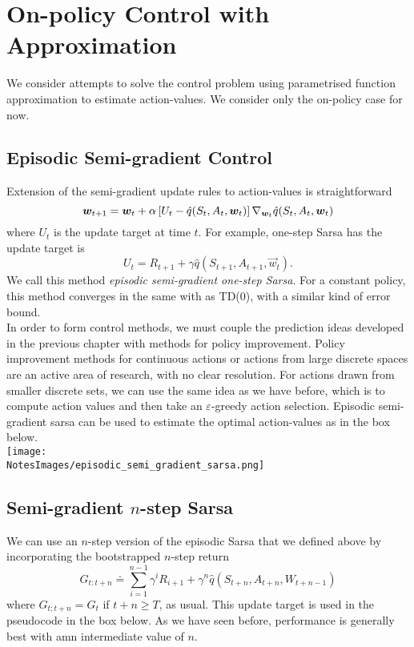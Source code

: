\section{On-policy Control with Approximation}
We consider attempts to solve the control problem using parametrised function approximation to estimate action-values. We consider only the on-policy case for now.

\subsection{Episodic Semi-gradient Control}
Extension of the semi-gradient update rules to action-values is straightforward
\begin{equation}
    \boldsymbol{w}_{t+1} = \boldsymbol{w}_t + \alpha \left[ U_t - \hat{q}(S_t, A_t, \boldsymbol{w}_t) \right] \nabla_{\boldsymbol{w}_t} \hat{q}(S_t, A_t, \boldsymbol{w}_t)
\end{equation}
where $U_t$ is the update target at time $t$. For example, one-step Sarsa has the update target is
\[
    U_t = R_{t+1} + \gamma \hat{q}(S_{t+1}, A_{t+1}, \vec{w}_t).
\]
We call this method \emph{episodic semi-gradient one-step Sarsa}. For a constant policy, this method converges in the same with as TD(0), with a similar kind of error bound.\\

In order to form control methods, we must couple the prediction ideas developed in the previous chapter with methods for policy improvement. Policy improvement methods for continuous actions or actions from large discrete spaces are an active area of research, with no clear resolution. For actions drawn from smaller discrete sets, we can use the same idea as we have before, which is to compute action values and then take an $\varepsilon$-greedy action selection. Episodic semi-gradient sarsa can be used to estimate the optimal action-values as in the box below.\\

\texttt{[image: \\NotesImages/episodic\_semi\_gradient\_sarsa.png]}\\

\subsection{Semi-gradient $n$-step Sarsa}
We can use an $n$-step version of the episodic Sarsa that we defined above by incorporating the bootstrapped $n$-step return 
\begin{equation}
    G_{t:t+n} \doteq \sum_{i=1}^{n-1} \gamma^i R_{i+1} + \gamma^n \hat{q}(S_{t+n}, A_{t+n}, W_{t+n-1})
\end{equation}
where $G_{t:t+n} = G_{t}$ if $t + n \geq T$, as usual. This update target is used in the pseudocode in the box below. As we have seen before, performance is generally best with amn intermediate value of $n$. \\

